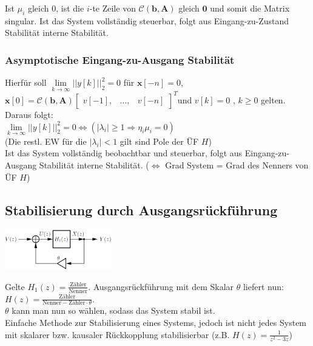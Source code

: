 \documentclass[a4paper,landscape,6pt]{article}
\newcommand{\ma}[1]{\ensuremath{\boldsymbol {#1}}}								%
\newcommand{\mat}[1]{\ensuremath{\begin{bmatrix} #1 \end{bmatrix}}}				%
\renewcommand{\vec}[1]{\ensuremath{\boldsymbol {#1}}}							%
\begin{document}
\begin{multicols}{3}
Ist $\mu_i$ gleich 0, ist die $i$-te Zeile von $\ma{\mathcal{C}}(\vec b, \ma A)$ gleich $\vec 0$ und somit die Matrix singular.
Ist das System vollständig steuerbar, folgt aus Eingang-zu-Zustand Stabilität interne Stabilität.
\subsubsection*{Asymptotische Eingang-zu-Ausgang Stabilität}
Hierfür soll $\lim\limits_{k \rightarrow \infty} ||y[k]||_2^2 = 0$ für $\vec x[-n]=0$, $\vec x[0] = \ma{\mathcal{C}}(\vec b, \ma A) \mat{v[-1], & \dots ,& v[-n]}^T$und $v[k] = 0$ , $k\ge 0$ gelten. Daraus folgt:\\

\tab $\boxed{\lim\limits_{k \rightarrow \infty} ||y[k]||_2^2 = 0 \Leftrightarrow (|\lambda_i| \ge 1 \Rightarrow \eta_i \mu_i = 0)}$\\
(Die restl. EW für die $|\lambda_i| < 1$ gilt sind Pole der ÜF $H$)\\

Ist das System vollständig beobachtbar und steuerbar, folgt aus Eingang-zu-Ausgang Stabilität interne Stabilität. ($\Leftrightarrow$ Grad System = Grad des Nenners von ÜF $H$)
\subsection*{Stabilisierung durch Ausgangsrückführung}
	\begin{minipage}[t]{0.5\textwidth}
		\hspace{1 cm}
		\includegraphics[width=0.35\textwidth]{images_ssp/outputfeedback}\\
	\end{minipage}

Gelte $H_1(z) = \frac{\text{Zähler}}{\text{Nenner}}$. Ausgangsrückführung mit dem Skalar $\theta$ liefert nun: $H(z)=\frac{\text{Zähler}}{\text{Nenner} - \text{Zähler}\cdot\theta}$.\\
$\theta$ kann man nun so wählen, sodass das System stabil ist.\\
Einfache Methode zur Stabilisierung eines Systems, jedoch ist nicht jedes System mit skalarer bzw. kausaler Rückkopplung stabilisierbar (z.B. $H(z) = \frac{1}{z^2-3z}$)


\end{multicols}
\end{document}
